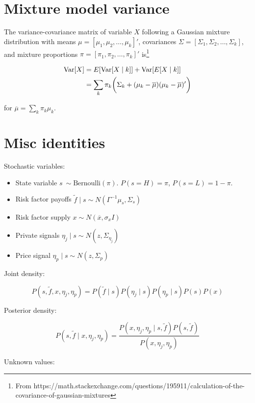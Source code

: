 \documentclass{article}
\begin{document}
\section{Mixture model variance}

The variance-covariance matrix of variable $X$ following a Gaussian mixture distribution with means $\mu = [\mu_1, \mu_2, \dots, \mu_k]'$, covariances $\Sigma= [\Sigma_1, \Sigma_2, \dots, \Sigma_k]$, and mixture proportions $\pi = [\pi_1, \pi_2, \dots, \pi_k]'$ is\footnote{From https://math.stackexchange.com/questions/195911/calculation-of-the-covariance-of-gaussian-mixtures} 

\begin{align}
    \text{Var}[X] &= E[\text{Var}[X \mid k]] + \text{Var}[E[X \mid k]] \\
            &= \sum_k  \pi_k  \bigg(\Sigma_k + (\mu_k - \overline{\mu})(\mu_k - \overline{\mu})' \bigg)
\end{align}

\noindent for $\overline{\mu}=\sum_k \pi_k \mu_k$.

\section{Misc identities}

Stochastic variables:

\begin{itemize}
    \item State variable $s ~ \sim \text{Bernoulli}(\pi)$. $P(s=H) = \pi$, $P(s=L) = 1-\pi$.
    \item Risk factor payoffs $\tilde f \mid s \sim N(\Gamma^{-1} \mu_s, \Sigma_s)$
    \item Risk factor supply $x \sim N(\overline{x}, \sigma_x I)$
    \item Private signals $\eta_j \mid s \sim N(z, \Sigma_{\eta_j})$
    \item Price signal $\eta_p \mid s \sim N(z, \Sigma_p)$
\end{itemize}

Joint density:

$$
P(s, \tilde f, x, \eta_j, \eta_p) = P(\tilde f \mid s) P(\eta_j \mid s) P(\eta_p \mid s) P(s)  P(x)
$$

Posterior density:

$$
P(s, \tilde f \mid x, \eta_j, \eta_p) = 
    \frac{
        P(x, \eta_j, \eta_p \mid s, \tilde f) P(s, \tilde f)
    }{
        P(x, \eta_j, \eta_p)
    }
$$

Unknown values:
\end{document}
